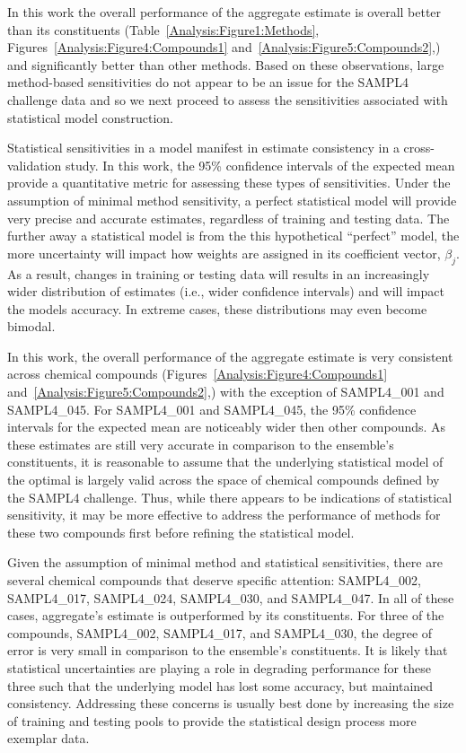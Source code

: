 \documentclass[journal=jpcbfk, manuscript=article]{achemso}
\newcommand{\+}[1]{\ensuremath{\mathbf{#1}}}
\begin{document}
In this work the overall performance of the aggregate estimate is overall better than its constituents (Table~\ref{Analysis:Figure1:Methods}, Figures~\ref{Analysis:Figure4:Compounds1} and~\ref{Analysis:Figure5:Compounds2},) and significantly better than other methods.
Based on these observations, large method-based sensitivities do not appear to be an issue for the SAMPL4 challenge data and so we next proceed to assess
the sensitivities associated with statistical model construction. 

Statistical sensitivities in a model manifest in estimate consistency in a cross-validation study.
In this work, the 95\% confidence intervals of the expected mean provide a quantitative metric for assessing these types of sensitivities. 
Under the assumption of minimal method sensitivity, a perfect statistical model will provide very precise and accurate estimates, regardless of training and testing data.
The further away a statistical model is from the this hypothetical ``perfect'' model, the more uncertainty will impact how weights are assigned in its coefficient vector, $\beta_j$.
As a result, changes in training or testing data will results in an increasingly wider distribution of estimates (i.e., wider confidence intervals) and will impact the models accuracy.
In extreme cases, these distributions may even become bimodal.

In this work, the overall performance of the aggregate estimate is very consistent across chemical compounds (Figures~\ref{Analysis:Figure4:Compounds1} and~\ref{Analysis:Figure5:Compounds2},) with the exception of SAMPL4\_001 and SAMPL4\_045.
For SAMPL4\_001 and SAMPL4\_045, the 95\% confidence intervals for the expected mean are noticeably wider then other compounds.
As these estimates are still very accurate in comparison to the ensemble's constituents, it is reasonable to assume that the underlying statistical model of the optimal is largely valid across the space of chemical compounds defined by the SAMPL4 challenge.
Thus, while there appears to be indications of statistical sensitivity, it may be more effective to address the performance of methods for these two compounds first before refining the statistical model.

Given the assumption of minimal method and statistical sensitivities, there are several chemical compounds that deserve specific attention: SAMPL4\_002, SAMPL4\_017, SAMPL4\_024, SAMPL4\_030, and SAMPL4\_047.
In all of these cases, aggregate's estimate is outperformed by its constituents.
For three of the compounds,  SAMPL4\_002, SAMPL4\_017, and SAMPL4\_030, the degree of error is very small in comparison to the ensemble's constituents. 
It is likely that statistical uncertainties are playing a role in degrading performance for these three such that the underlying model has lost some accuracy, but maintained consistency.
Addressing these concerns is usually best done by increasing the size of training and testing pools to provide the statistical design process more exemplar data.
\end{document}
